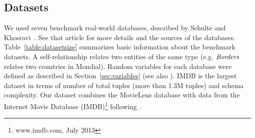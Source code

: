 \documentclass{acm_proc_article-sp}
\begin{document}
\subsection{Datasets}
We used seven benchmark real-world databases,  described by Schulte and Khosravi~\cite{Schulte2012}. See that article for more details and the sources of the databases. Table~\ref{table:datasetsize} summarizes basic information about the benchmark datasets.  A  self-relationship %
relates two entities of the same type (e.g. $\it{Borders}$ relates two countries in Mondial). Random variables for each database were defined as described in Section~\ref{sec:variables} (see also \cite{Schulte2012}). IMDB is the largest dataset in terms of number of total tuples (more than 1.3M tuples)
and schema complexity. %
Our dataset combines the MovieLens database with data from the Internet Movie Database (IMDB)\footnote{www.imdb.com, July 2013} following \cite{Peralta2007}.
\end{document}
